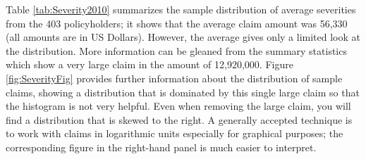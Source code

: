 \documentclass[]{book}
\begin{document}
Table \ref{tab:Severity2010} summarizes the sample distribution of
average severities from the 403 policyholders; it shows that the average
claim amount was 56,330 (all amounts are in US Dollars). However, the
average gives only a limited look at the distribution. More information
can be gleaned from the summary statistics which show a very large claim
in the amount of 12,920,000. Figure \ref{fig:SeverityFig} provides
further information about the distribution of sample claims, showing a
distribution that is dominated by this single large claim so that the
histogram is not very helpful. Even when removing the large claim, you
will find a distribution that is skewed to the right. A generally
accepted technique is to work with claims in logarithmic units
especially for graphical purposes; the corresponding figure in the
right-hand panel is much easier to interpret.
\end{document}
